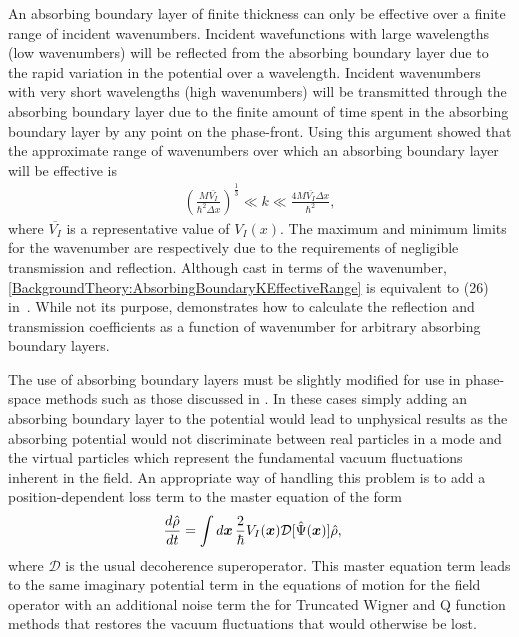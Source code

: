 An absorbing boundary layer of finite thickness can only be effective over a finite range of incident wavenumbers. Incident wavefunctions with large wavelengths (low wavenumbers) will be reflected from the absorbing boundary layer due to the rapid variation in the potential over a wavelength. Incident wavenumbers with very short wavelengths (high wavenumbers) will be transmitted through the absorbing boundary layer due to the finite amount of time spent in the absorbing boundary layer by any point on the phase-front.  Using this argument \citet{Neuhasuer:1989} showed that the approximate range of wavenumbers over which an absorbing boundary layer will be effective is
\begin{align}
    \label{BackgroundTheory:AbsorbingBoundaryKEffectiveRange}
    \left( \frac{M \overline{V_I}}{\hbar^2 \Delta x}\right)^{\frac{1}{3}} \ll k \ll \frac{4 M \overline{V_I} \Delta x}{\hbar^2},
\end{align}
where $\overline{V_I}$ is a representative value of $V_I(x)$. The maximum and minimum limits for the wavenumber are respectively due to the requirements of negligible transmission and reflection. Although cast in terms of the wavenumber, \eqref{BackgroundTheory:AbsorbingBoundaryKEffectiveRange} is equivalent to (26) in~\citep{Neuhasuer:1989}. While not its purpose,  demonstrates how to calculate the reflection and transmission coefficients as a function of wavenumber for arbitrary absorbing boundary layers.

The use of absorbing boundary layers must be slightly modified for use in phase-space methods such as those discussed in . In these cases simply adding an absorbing boundary layer to the potential would lead to unphysical results as the absorbing potential would not discriminate between real particles in a mode and the virtual particles which represent the fundamental vacuum fluctuations inherent in the field. An appropriate way of handling this problem is to add a position-dependent loss term to the master equation of the form
\begin{align}
    \label{BackgroundTheory:PhaseSpaceAbsorbingBoundaryLayer}
    \frac{d \hat{\rho}}{dt} &= \int d \vect{x}\, \frac{2}{\hbar}V_I(\vect{x})\mathcal{D}[\hat{\Psi}(\vect{x})]\hat{\rho},
\end{align}
where $\mathcal{D}$ is the usual decoherence superoperator. This master equation term leads to the same imaginary potential term in the equations of motion for the field operator with an additional noise term the for Truncated Wigner and Q function methods that restores the vacuum fluctuations that would otherwise be lost.

